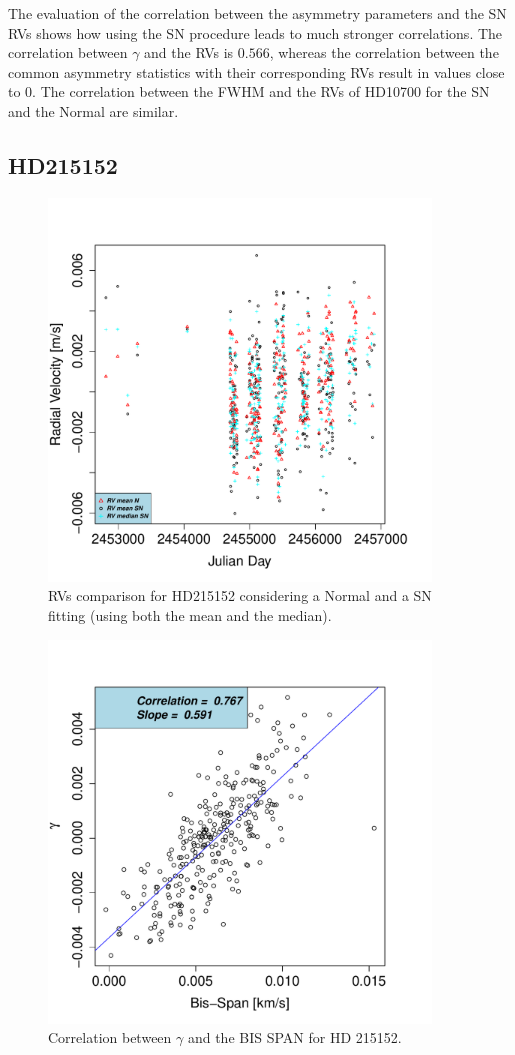 \documentclass[11pt, oneside]{article}
\begin{document}
The evaluation of the correlation between the asymmetry parameters and the SN RVs shows how using the SN procedure leads to much stronger correlations. The correlation between $\gamma$ and the RVs is $0.566$, whereas the correlation between the common asymmetry statistics with their corresponding RVs result in values close to $0$. The correlation between the FWHM and the RVs of HD10700 for the SN and the Normal are similar. 
\fi

\subsection{HD215152}  \label{sec:HD215152}
%
\begin{figure}[htbp]
   \centering
\includegraphics[height = 4in]{[0]HD21515_vs_time.pdf} 
   \caption{RVs comparison for HD215152 considering a Normal and a SN fitting (using both the mean and the median).}
   \label{fig:HD215152:RV}
\end{figure}
%
\begin{figure}[htbp]
   \centering
\includegraphics[height = 4in]{HD21515_[2]gamma_vs_bisspan.pdf} 
   \caption{Correlation between $\gamma$ and the BIS SPAN for HD 215152.}
   \label{fig:HD215152:corr.gamma}
\end{figure}
\end{document}

